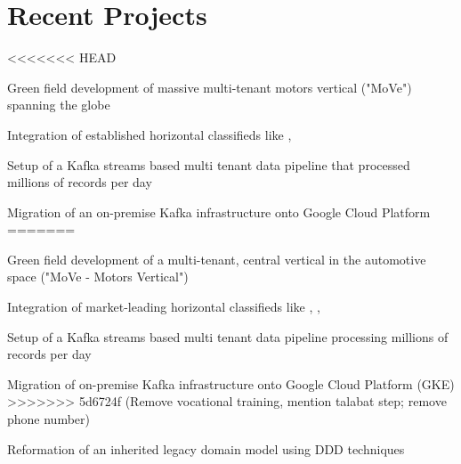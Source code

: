 \documentclass[]{resume}
\begin{document}
\hfill
\begin{minipage}[t]{0.64\textwidth}


\section{Recent Projects}

\vspace{\topsep} %
\sectionsep

<<<<<<< HEAD
\vspace{\topsep} %
\begin{tightemize}
\item Green field development of massive  multi-tenant motors vertical ("MoVe") spanning the globe
\item Integration of established horizontal classifieds like \href{https://www.kijiji.ca}{}, \href{https://www.gumtree.com.au}{}
\item Setup of a Kafka streams based multi tenant data pipeline that processed millions of records per day
\item Migration of an on-premise Kafka infrastructure onto Google Cloud Platform
=======
\vspace{\topsep} %
\begin{tightemize}
\item Green field development of a multi-tenant, central vertical in the automotive space ("MoVe - Motors Vertical")
\item Integration of market-leading horizontal classifieds like \href{https://www.kijiji.ca}{}, \href{https://www.gumtree.com.au}{}, \href{https://www.gumtree.co.uk}{}
\item Setup of a Kafka streams based multi tenant data pipeline processing millions of records per day
\item Migration of on-premise Kafka infrastructure onto Google Cloud Platform (GKE)
>>>>>>> 5d6724f (Remove vocational training, mention talabat step; remove phone number)
\item Reformation of an inherited legacy domain model using DDD techniques
\end{tightemize}
\sectionsep


\end{tightemize}
\end{minipage}
\end{document}
